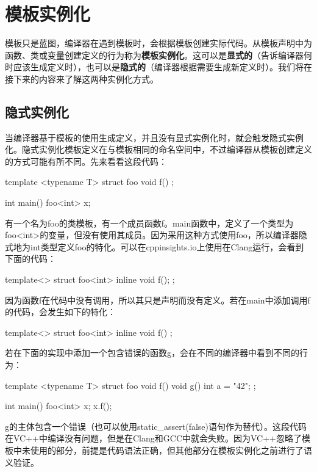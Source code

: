 \section{模板实例化}

模板只是蓝图，编译器在遇到模板时，会根据模板创建实际代码。从模板声明中为函数、类或变量创建定义的行为称为\textbf{模板实例化}。这可以是\textbf{显式的}（告诉编译器何时应该生成定义时），也可以是\textbf{隐式的}（编译器根据需要生成新定义时）。我们将在接下来的内容来了解这两种实例化方式。

\subsection{隐式实例化}

当编译器基于模板的使用生成定义，并且没有显式实例化时，就会触发隐式实例化。隐式实例化模板定义在与模板相同的命名空间中，不过编译器从模板创建定义的方式可能有所不同。先来看看这段代码：

\begin{cppcode}
template <typename T>
struct foo
{
	void f() {}
};

int main()
{
	foo<int> x;
}
\end{cppcode}

有一个名为foo的类模板，有一个成员函数f。main函数中，定义了一个类型为foo<int>的变量，但没有使用其成员。因为采用这种方式使用foo，所以编译器隐式地为int类型定义foo的特化。可以在cppinsights.io上使用在Clang运行，会看到下面的代码：

\begin{cppcode}
template<>
struct foo<int>
{
	inline void f();
};
\end{cppcode}

因为函数f在代码中没有调用，所以其只是声明而没有定义。若在main中添加调用f的代码，会发生如下的特化：

\begin{cppcode}
template<>
struct foo<int>
{
	inline void f() { }
};
\end{cppcode}

若在下面的实现中添加一个包含错误的函数g，会在不同的编译器中看到不同的行为：

\begin{cppcode}
template <typename T>
struct foo
{
	void f() {}
	void g() {int a = "42";}
};

int main()
{
	foo<int> x;
	x.f();
}
\end{cppcode}

g的主体包含一个错误（也可以使用static_assert(false)语句作为替代）。这段代码在VC++中编译没有问题，但是在Clang和GCC中就会失败。因为VC++忽略了模板中未使用的部分，前提是代码语法正确，但其他部分在模板实例化之前进行了语义验证。


